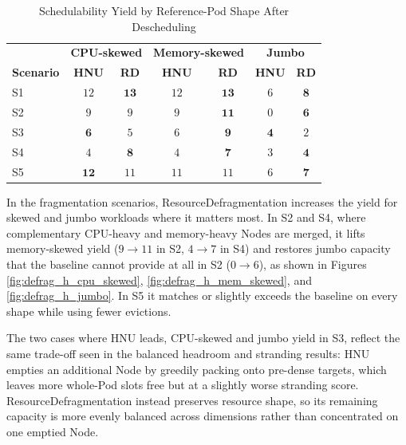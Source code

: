 \begin{table}[tbp]
    \centering
    \caption{Schedulability Yield by Reference-Pod Shape After Descheduling}
    \label{tab:defrag_shape_headroom}
    \small
    \renewcommand{\arraystretch}{1.2}
    \begin{tabular}{l cc cc cc}
        \hline
        & \multicolumn{2}{c}{\textbf{CPU-skewed}} & \multicolumn{2}{c}{\textbf{Memory-skewed}} & \multicolumn{2}{c}{\textbf{Jumbo}} \\
        \textbf{Scenario} & \textbf{HNU} & \textbf{RD} & \textbf{HNU} & \textbf{RD} & \textbf{HNU} & \textbf{RD} \\
        \hline
        S1 & \(12\) & \(\mathbf{13}\) & \(12\) & \(\mathbf{13}\) & \(6\) & \(\mathbf{8}\) \\
        S2 & \(9\)  & \(9\)          & \(9\)  & \(\mathbf{11}\) & \(0\) & \(\mathbf{6}\) \\
        S3 & \(\mathbf{6}\) & \(5\)   & \(6\)  & \(\mathbf{9}\)  & \(\mathbf{4}\) & \(2\) \\
        S4 & \(4\)  & \(\mathbf{8}\)  & \(4\)  & \(\mathbf{7}\)  & \(3\) & \(\mathbf{4}\) \\
        S5 & \(\mathbf{12}\) & \(11\) & \(11\) & \(11\)          & \(6\) & \(\mathbf{7}\) \\
        \hline
    \end{tabular}
\end{table}

In the fragmentation scenarios, ResourceDefragmentation increases the yield for skewed and jumbo workloads where it matters most. In S2 and S4, where complementary CPU-heavy and memory-heavy Nodes are merged, it lifts memory-skewed yield (\(9 \to 11\) in S2, \(4 \to 7\) in S4) and restores jumbo capacity that the baseline cannot provide at all in S2 (\(0 \to 6\)), as shown in Figures \ref{fig:defrag_h_cpu_skewed}, \ref{fig:defrag_h_mem_skewed}, and \ref{fig:defrag_h_jumbo}. In S5 it matches or slightly exceeds the baseline on every shape while using fewer evictions.

The two cases where HNU leads, CPU-skewed and jumbo yield in S3, reflect the same trade-off seen in the balanced headroom and stranding results: HNU empties an additional Node by greedily packing onto pre-dense targets, which leaves more whole-Pod slots free but at a slightly worse stranding score. ResourceDefragmentation instead preserves resource shape, so its remaining capacity is more evenly balanced across dimensions rather than concentrated on one emptied Node.

